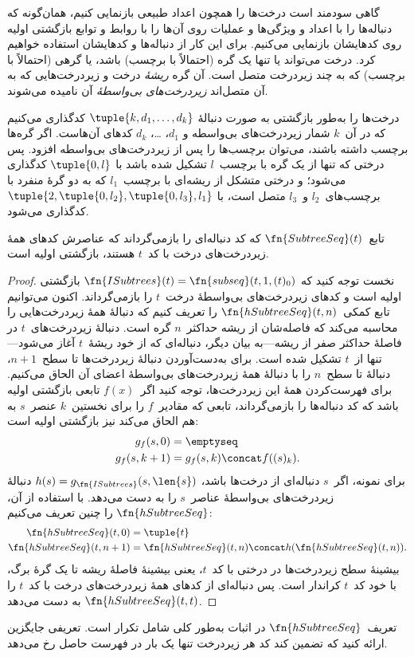 \documentclass[../../../include/open-logic-section]{subfiles}
\begin{document}

گاهی سودمند است درخت‌ها را همچون اعداد طبیعی بازنمایی کنیم، همان‌گونه
که دنباله‌ها را با اعداد و ویژگی‌ها و عملیات روی آن‌ها را با روابط و
توابع بازگشتی اولیه روی کدهایشان بازنمایی می‌کنیم. برای این کار از
دنباله‌ها و کدهایشان استفاده خواهیم کرد. درخت می‌تواند یا تنها یک گره
(احتمالاً با برچسب) باشد، یا گرهی (احتمالاً با برچسب) که به چند
زیردرخت متصل است. آن گره 
\emph{ریشهٔ} درخت و زیردرخت‌هایی که به آن متصل‌اند 
\emph{زیردرخت‌های بی‌واسطهٔ} آن نامیده می‌شوند.

درخت‌ها را به‌طور بازگشتی به صورت دنبالهٔ
$\tuple{k,d_1,\dots,d_k}$ کدگذاری می‌کنیم که در آن~$k$ شمار
زیردرخت‌های بی‌واسطه و $d_1$، \dots، $d_k$ کدهای آن‌هاست. اگر گره‌ها
برچسب داشته باشند، می‌توان برچسب‌ها را پس از زیردرخت‌های بی‌واسطه
افزود. پس درختی که تنها از یک گره با برچسب~$l$ تشکیل شده باشد با
$\tuple{0,l}$ کدگذاری می‌شود؛ و درختی متشکل از ریشه‌ای با برچسب~$l_1$
که به دو گرهٔ منفرد با برچسب‌های~$l_2$ و~$l_3$ متصل است، با
$\tuple{2,\tuple{0,l_2},\tuple{0,l_3},l_1}$ کدگذاری می‌شود.

\begin{prop}
  تابع~$\fn{SubtreeSeq}(t)$ که کد دنباله‌ای را بازمی‌گرداند که عناصرش
  کدهای همهٔ زیردرخت‌های درخت با کد~$t$ هستند، بازگشتی اولیه است.
\end{prop}

\begin{proof}
  نخست توجه کنید که
  $\fn{ISubtrees}(t)=\fn{subseq}(t,1,(t)_0)$ بازگشتی اولیه است و
  کدهای زیردرخت‌های بی‌واسطهٔ درخت~$t$ را بازمی‌گرداند. اکنون می‌توانیم
  تابع کمکی~$\fn{hSubtreeSeq}(t,n)$ را تعریف کنیم که دنبالهٔ همهٔ
  زیردرخت‌هایی را محاسبه می‌کند که فاصله‌شان از ریشه حداکثر~$n$ گره
  است. دنبالهٔ زیردرخت‌های~$t$ در فاصلهٔ حداکثر صفر از ریشه---به بیان
  دیگر، دنباله‌ای که از خود ریشهٔ~$t$ آغاز می‌شود---تنها از~$t$ تشکیل
  شده است. برای به‌دست‌آوردن دنبالهٔ زیردرخت‌ها تا سطح~$n+1$، دنبالهٔ
  تا سطح~$n$ را با دنبالهٔ همهٔ زیردرخت‌های بی‌واسطهٔ اعضای آن الحاق
  می‌کنیم. برای فهرست‌کردن همهٔ این زیردرخت‌ها، توجه کنید اگر~$f(x)$
  تابعی بازگشتی اولیه باشد که کد دنباله‌ها را بازمی‌گرداند، تابعی که
  مقادیر~$f$ را برای نخستین~$k$ عنصر~$s$ به هم الحاق می‌کند نیز
  بازگشتی اولیه است:
    \begin{align*}
      g_f(s, 0) & = \emptyseq\\
      g_f(s, k+1) & = g_f(s, k) \concat f((s)_k).
    \end{align*}
    برای نمونه، اگر~$s$ دنباله‌ای از درخت‌ها باشد،
    $h(s)=g_{\fn{ISubtrees}}(s,\len{s})$ دنبالهٔ زیردرخت‌های بی‌واسطهٔ
    عناصر~$s$ را به دست می‌دهد. با استفاده از آن،
    $\fn{hSubtreeSeq}$ را چنین تعریف می‌کنیم:
    \begin{align*}
      \fn{hSubtreeSeq}(t, 0) & = \tuple{t} \\
      \fn{hSubtreeSeq}(t, n+1) & = \fn{hSubtreeSeq}(t, n) \concat
      h(\fn{hSubtreeSeq}(t, n)).
    \end{align*}
    بیشینهٔ سطح زیردرخت‌ها در درختی با کد~$t$، یعنی بیشینهٔ فاصلهٔ
    ریشه تا یک گرهٔ برگ، با خود کد~$t$ کراندار است. پس دنباله‌ای از
    کدهای همهٔ زیردرخت‌های درخت با کد~$t$ را
    $\fn{hSubtreeSeq}(t,t)$ به دست می‌دهد.
\end{proof}

\begin{prob}
  تعریف~$\fn{hSubtreeSeq}$ در اثبات
   به‌طور کلی شامل تکرار است.
  تعریفی جایگزین ارائه کنید که تضمین کند کد هر زیردرخت تنها یک بار در
  فهرست حاصل رخ می‌دهد.
\end{prob}
\end{document}
